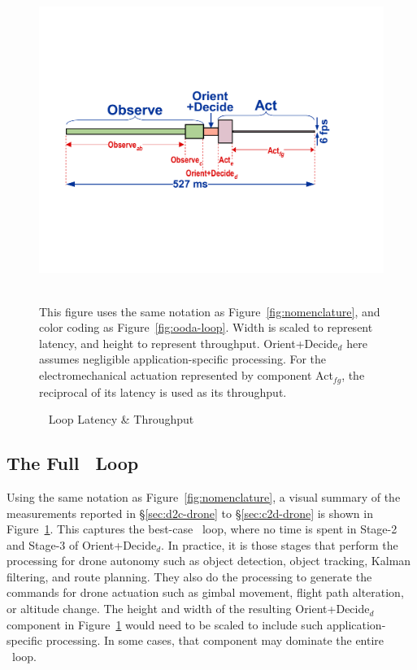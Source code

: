 \begin{figure}
\centering
\includegraphics[width=0.8\linewidth]{chapter5/FIGS/fig-ooda-scaling.pdf}
\begin{captext}
  \\[0.2cm]
  This figure uses the same notation as Figure~\ref{fig:nomenclature},
  and color coding as Figure~\ref{fig:ooda-loop}.  Width is scaled to
  represent latency, and height to represent throughput.
  Orient+Decide$_d$ here assumes negligible application-specific
  processing.  For the electromechanical actuation represented by
  component Act$_{fg}$, the reciprocal of its latency is used as its
  throughput.
\end{captext}
\caption{\ooda~ Loop Latency \& Throughput}
\label{fig:ooda-scaling}
\end{figure}

\subsection{The Full \ooda~Loop}
\label{sec:e2e-discussion}

Using the same notation as Figure~\ref{fig:nomenclature}, a visual
summary of the measurements reported in \S\ref{sec:d2c-drone} to
\S\ref{sec:c2d-drone} is shown in Figure~\ref{fig:ooda-scaling}.  This
captures the best-case \ooda~loop, where no time is spent in Stage-2
and Stage-3 of Orient+Decide$_d$.  In practice, it is those stages that
perform the processing for drone autonomy such as object detection,
object tracking, Kalman filtering, and route planning.  They also do
the processing to generate the commands for drone actuation such as
gimbal movement, flight path alteration, or altitude change.  The
height and width of the resulting Orient+Decide$_d$ component in
Figure~\ref{fig:ooda-scaling} would need to be scaled to include such
application-specific processing.  In some cases, that component
may dominate the entire \ooda~loop.

